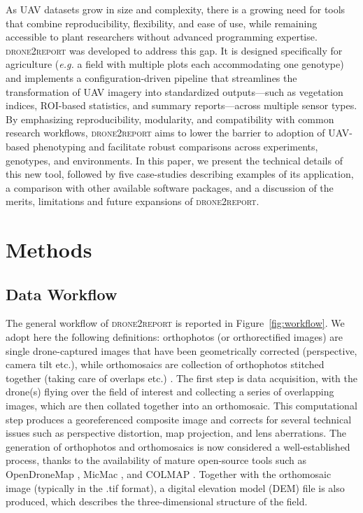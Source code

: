 \documentclass[drones,technicalnote,accept,pdftex,moreauthors]{Definitions/mdpi}
\begin{document}
As UAV datasets grow in size and complexity, there is a growing need for tools that combine reproducibility, flexibility, and ease of use, while remaining accessible to plant researchers without advanced programming expertise.
\textsc{drone2report} was developed to address this gap. It is designed specifically for agriculture (\textit{e.g.} a field with multiple plots each accommodating one genotype) and implements a configuration-driven pipeline that streamlines the transformation of UAV imagery into standardized outputs—such as vegetation indices, ROI-based statistics, and summary reports—across multiple sensor types. By emphasizing reproducibility, modularity, and compatibility with common research workflows, \textsc{drone2report} aims to lower the barrier to adoption of UAV-based phenotyping and facilitate robust comparisons across experiments, genotypes, and environments. 
In this paper, we present the technical details of this new tool, followed by five case-studies describing examples of its application, a comparison with other available software packages, and a discussion of the merits, limitations and future expansions of \textsc{drone2report}.

\section{Methods}
\label{methods}

\subsection{Data Workflow}
The general workflow of \textsc{drone2report} is reported in Figure~\ref{fig:workflow}. 
We adopt here the following definitions: orthophotos (or orthorectified images) are single drone-captured images that have been geometrically corrected (perspective, camera tilt etc.), while orthomosaics are collection of orthophotos stitched together (taking care of overlaps etc.) \cite{park2022deep}.
The first step is data acquisition, with the drone(s) flying over the field of interest and collecting a series of overlapping images, which are then collated together into an orthomosaic. This computational step produces a georeferenced composite image and corrects for several technical issues such as perspective distortion, map projection, and lens aberrations.
The generation of orthophotos and orthomosaics is now considered a well-established process, thanks to the availability of mature open-source tools such as OpenDroneMap \cite{noauthor_welcome_nodate}, MicMac \cite{rupnik2017micmac}, and COLMAP \cite{schoenberger2016sfm}. 
Together with the orthomosaic image (typically in the .tif format), a digital elevation model (DEM) file is also produced, which describes the three-dimensional structure of the field.
\end{document}
